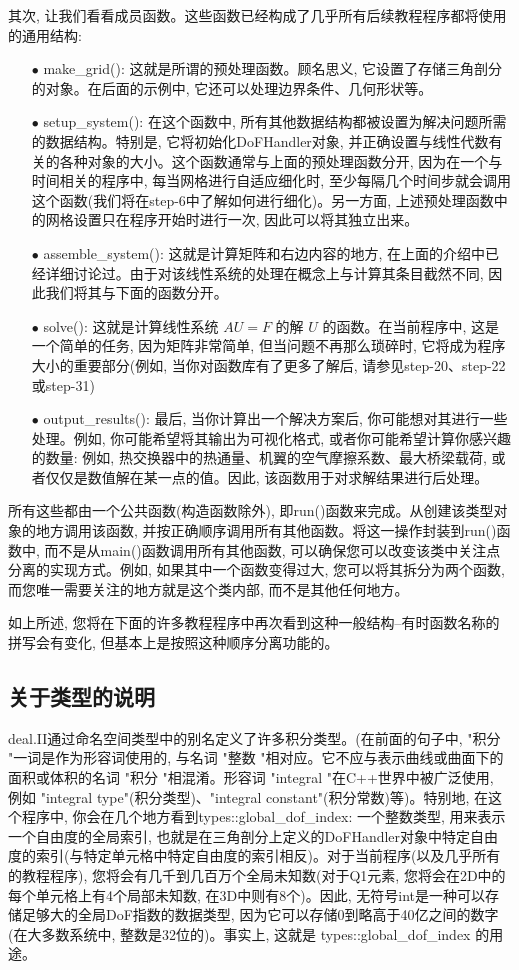 \documentclass[12pt, a4paper, oneside]{ctexart}
\begin{document}
其次, 让我们看看成员函数。这些函数已经构成了几乎所有后续教程程序都将使用的通用结构: 
\begin{itemize}
    \item[$\bullet$]make\_grid(): 这就是所谓的预处理函数。顾名思义, 它设置了存储三角剖分的对象。在后面的示例中, 它还可以处理边界条件、几何形状等。
    \item[$\bullet$]setup\_system(): 在这个函数中, 所有其他数据结构都被设置为解决问题所需的数据结构。特别是, 它将初始化DoFHandler对象, 并正确设置与线性代数有关的各种对象的大小。这个函数通常与上面的预处理函数分开, 因为在一个与时间相关的程序中, 每当网格进行自适应细化时, 至少每隔几个时间步就会调用这个函数(我们将在step-6中了解如何进行细化)。另一方面, 上述预处理函数中的网格设置只在程序开始时进行一次, 因此可以将其独立出来。
    \item[$\bullet$]assemble\_system(): 这就是计算矩阵和右边内容的地方, 在上面的介绍中已经详细讨论过。由于对该线性系统的处理在概念上与计算其条目截然不同, 因此我们将其与下面的函数分开。
    \item[$\bullet$]solve(): 这就是计算线性系统 $AU=F$ 的解 $U$ 的函数。在当前程序中, 这是一个简单的任务, 因为矩阵非常简单, 但当问题不再那么琐碎时, 它将成为程序大小的重要部分(例如, 当你对函数库有了更多了解后, 请参见step-20、step-22或step-31)  
    \item[$\bullet$]output\_results(): 最后, 当你计算出一个解决方案后, 你可能想对其进行一些处理。例如, 你可能希望将其输出为可视化格式, 或者你可能希望计算你感兴趣的数量: 例如, 热交换器中的热通量、机翼的空气摩擦系数、最大桥梁载荷, 或者仅仅是数值解在某一点的值。因此, 该函数用于对求解结果进行后处理。
\end{itemize}
所有这些都由一个公共函数(构造函数除外), 即run()函数来完成。从创建该类型对象的地方调用该函数, 并按正确顺序调用所有其他函数。将这一操作封装到run()函数中, 而不是从main()函数调用所有其他函数, 可以确保您可以改变该类中关注点分离的实现方式。例如, 如果其中一个函数变得过大, 您可以将其拆分为两个函数, 而您唯一需要关注的地方就是这个类内部, 而不是其他任何地方。

如上所述, 您将在下面的许多教程程序中再次看到这种一般结构--有时函数名称的拼写会有变化, 但基本上是按照这种顺序分离功能的。

\subsection{关于类型的说明}
deal.II通过命名空间类型中的别名定义了许多积分类型。(在前面的句子中, "积分 "一词是作为形容词使用的, 与名词 "整数 "相对应。它不应与表示曲线或曲面下的面积或体积的名词 "积分 "相混淆。形容词 "integral "在C++世界中被广泛使用, 例如 "integral type"(积分类型)、"integral constant"(积分常数)等)。特别地, 在这个程序中, 你会在几个地方看到types::global\_dof\_index: 一个整数类型, 用来表示一个自由度的全局索引, 也就是在三角剖分上定义的DoFHandler对象中特定自由度的索引(与特定单元格中特定自由度的索引相反)。对于当前程序(以及几乎所有的教程程序), 您将会有几千到几百万个全局未知数(对于Q1元素, 您将会在2D中的每个单元格上有4个局部未知数, 在3D中则有8个)。因此, 无符号int是一种可以存储足够大的全局DoF指数的数据类型, 因为它可以存储0到略高于40亿之间的数字(在大多数系统中, 整数是32位的)。事实上, 这就是 types::global\_dof\_index 的用途。
\end{document}
